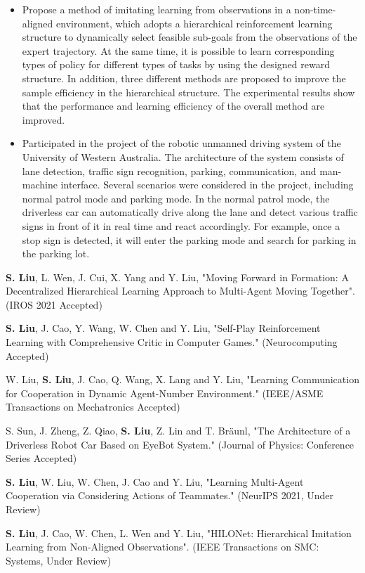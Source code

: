 {\begin{itemize}
    \item Propose a method of imitating learning from observations in a non-time-aligned environment, which adopts a hierarchical reinforcement learning structure to dynamically select feasible sub-goals from the observations of the expert trajectory. At the same time, it is possible to learn corresponding types of policy for different types of tasks by using the designed reward structure. In addition, three different methods are proposed to improve the sample efficiency in the hierarchical structure. The experimental results show that the performance and learning efficiency of the overall method are improved.
  \end{itemize}
}

{\small
  \begin{itemize}
    \item Participated in the project of the robotic unmanned driving system of the University of Western Australia. The architecture of the system consists of lane detection, traffic sign recognition, parking, communication, and man-machine interface. Several scenarios were considered in the project, including normal patrol mode and parking mode. In the normal patrol mode, the driverless car can automatically drive along the lane and detect various traffic signs in front of it in real time and react accordingly. For example, once a stop sign is detected, it will enter the parking mode and search for parking in the parking lot.
  \end{itemize}
}


\begin{itemize}[leftmargin=*]
  {\small
  \item
  \textbf{S. Liu}, L. Wen, J. Cui, X. Yang and Y. Liu, "Moving Forward in Formation: A Decentralized Hierarchical Learning Approach to Multi-Agent Moving Together". (IROS 2021 Accepted)
  \item
  \textbf{S. Liu}, J. Cao, Y. Wang, W. Chen and Y. Liu, "Self-Play Reinforcement Learning with Comprehensive Critic in Computer Games." (Neurocomputing Accepted)
  \item
  W. Liu, \textbf{S. Liu}, J. Cao, Q. Wang, X. Lang and Y. Liu, "Learning Communication for Cooperation in Dynamic Agent-Number Environment." (IEEE/ASME Transactions on Mechatronics Accepted)
  \item 
  S. Sun, J. Zheng, Z. Qiao, \textbf{S. Liu}, Z. Lin and T. Bräunl, "The Architecture of a Driverless Robot Car Based on EyeBot System." (Journal of Physics: Conference Series Accepted)
  \item
  \textbf{S. Liu}, W. Liu, W. Chen, J. Cao and Y. Liu, "Learning Multi-Agent Cooperation via Considering Actions of Teammates." (NeurIPS 2021, Under Review)}
  \item
  \textbf{S. Liu}, J. Cao, W. Chen, L. Wen and Y. Liu, "HILONet: Hierarchical Imitation Learning from Non-Aligned Observations". (IEEE Transactions on SMC: Systems, Under Review)

\end{itemize}